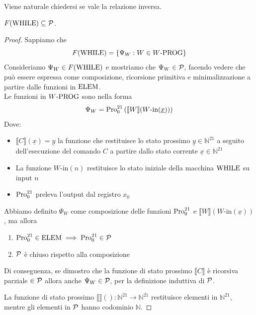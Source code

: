 \vspace{-0.5cm}

Viene naturale chiedersi se vale la relazione inversa.

\begin{theor}
	$F(\text{WHILE}) \subseteq \mathcal{P}$.
\end{theor}
\begin{proof}
	Sappiamo che
	$$ F(\text{WHILE}) = \{\Psi_W: W \in W\text{-PROG}\}$$
	Consideriamo $\Psi_W \in F(\text{WHILE})$ e mostriamo che $\Psi_W \in \mathcal{P}$, facendo vedere che può essere espressa come composizione, ricorsione primitiva e minimalizzazione a partire dalle funzioni in $\text{ELEM}$.\\
	
	Le funzioni in $W\text{-PROG}$ sono nella forma
	$$ \Psi_W = \text{Pro}_0^{21} \left( \llbracket W \rrbracket (W\text{-in}(\underline{x})) \right) $$
	Dove: 
	\begin{itemize}
		\item $\llbracket C \rrbracket (\underline{x}) = \underline{y}$ la funzione che restituisce lo stato prossimo $\underline{y} \in \mathbb{N}^{21}$ a seguito dell'esecuzione del comando $C$ a partire dallo stato corrente $\underline{x} \in \mathbb{N}^{21}$
		
		\item La funzione $W\text{-in}(n)$ restituisce lo stato iniziale della macchina $\text{WHILE}$ su input $n$
		
		\item $\text{Pro}_0^{21}$ preleva l'output dal registro $x_0$
	\end{itemize}
	
	Abbiamo definito $\Psi_W$ come composizione delle funzioni $\text{Pro}_0^{21}$ e $\llbracket W \rrbracket (W\text{-in}(\underline{x}))$, ma allora
	\begin{enumerate}
		\item $\text{Pro}_0^{21} \in \text{ELEM} \implies \text{Pro}_0^{21} \in \mathcal{P}$
		\item $\mathcal{P}$ è chiuso rispetto alla composizione
	\end{enumerate}
	Di conseguenza, se dimostro che la funzione di stato prossimo $\llbracket C \rrbracket$ è ricorsiva parziale $\in \mathcal{P}$ allora anche $\Psi_W \in \mathcal{P}$, per la definizione induttiva di $\mathcal{P}$.
	
	La funzione di stato prossimo $\llbracket \rrbracket (): \mathbb{N}^{21} \rightarrow \mathbb{N}^{21}$ restituisce elementi in $\mathbb{N}^{21}$, mentre gli elementi in $\mathcal{P}$ hanno codominio $\mathbb{N}$.
	

\end{proof}

